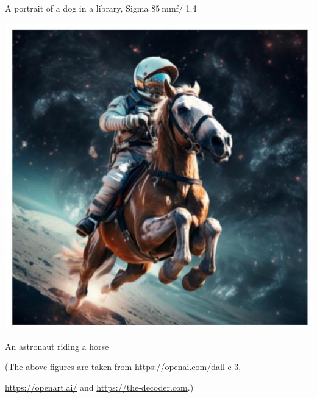 \documentclass[10pt]{article}
\begin{document}
A portrait of a dog in a library, Sigma $85 \mathrm{~mm} \mathrm{f} /$ 1.4

\begin{center}
\includegraphics[max width=\textwidth]{2024_01_08_a381fc3992661ee7020eg-19}
\end{center}

An astronaut riding a horse

(The above figures are taken from \href{https://openai.com/dall-e-3}{https://openai.com/dall-e-3},

\href{https://openart.ai/}{https://openart.ai/} and \href{https://the-decoder.com}{https://the-decoder.com}.)
\end{document}
